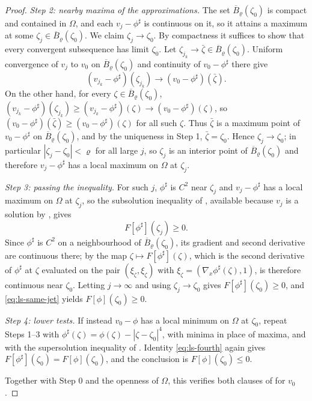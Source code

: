 \begin{proof}
\emph{Step 2: nearby maxima of the approximations.}
The set $\overline B_\varrho(\zeta_0)$ is compact and contained in $\Omega$, and
each $v_j-\phi^\sharp$ is continuous on it, so it attains a maximum at some
$\zeta_j\in\overline B_\varrho(\zeta_0)$. We claim $\zeta_j\to\zeta_0$. By
compactness it suffices to show that every convergent subsequence has limit
$\zeta_0$. Let $\zeta_{j_k}\to\bar\zeta\in\overline B_\varrho(\zeta_0)$. Uniform
convergence of $v_j$ to $v_0$ on $\overline B_\varrho(\zeta_0)$ and continuity of
$v_0-\phi^\sharp$ there give
\[
  (v_{j_k}-\phi^\sharp)(\zeta_{j_k})\longrightarrow
  (v_0-\phi^\sharp)(\bar\zeta).
\]
On the other hand, for every $\zeta\in\overline B_\varrho(\zeta_0)$,
$(v_{j_k}-\phi^\sharp)(\zeta_{j_k})\ge(v_{j_k}-\phi^\sharp)(\zeta)
 \to(v_0-\phi^\sharp)(\zeta)$, so
$(v_0-\phi^\sharp)(\bar\zeta)\ge(v_0-\phi^\sharp)(\zeta)$ for all such $\zeta$.
Thus $\bar\zeta$ is a maximum point of $v_0-\phi^\sharp$ on
$\overline B_\varrho(\zeta_0)$, and by the uniqueness in Step 1,
$\bar\zeta=\zeta_0$. Hence $\zeta_j\to\zeta_0$; in particular
$|\zeta_j-\zeta_0|<\varrho$ for all large $j$, so $\zeta_j$ is an interior point
of $\overline B_\varrho(\zeta_0)$ and therefore $v_j-\phi^\sharp$ has a local
maximum on $\Omega$ at $\zeta_j$.

\emph{Step 3: passing the inequality.}
For such $j$, $\phi^\sharp$ is $C^2$ near $\zeta_j$ and $v_j-\phi^\sharp$ has a
local maximum on $\Omega$ at $\zeta_j$, so the subsolution inequality of
, available because $v_j$ is a solution by
, gives
\[
  F[\phi^\sharp](\zeta_j)\ge0 .
\]
Since $\phi^\sharp$ is $C^2$ on a neighbourhood of
$\overline B_\varrho(\zeta_0)$, its gradient and second derivative are
continuous there; by  the map
$\zeta\mapsto F[\phi^\sharp](\zeta)$, which is the second derivative of
$\phi^\sharp$ at $\zeta$ evaluated on the pair $(\xi_\zeta,\xi_\zeta)$ with
$\xi_\zeta=(\nabla_x\phi^\sharp(\zeta),1)$, is therefore continuous near
$\zeta_0$. Letting $j\to\infty$ and using $\zeta_j\to\zeta_0$ gives
$F[\phi^\sharp](\zeta_0)\ge0$, and \eqref{eq:ls-same-jet} yields
$F[\phi](\zeta_0)\ge0$.

\emph{Step 4: lower tests.}
If instead $v_0-\phi$ has a local minimum on $\Omega$ at $\zeta_0$, repeat
Steps 1--3 with $\phi^\sharp(\zeta)=\phi(\zeta)-|\zeta-\zeta_0|^4$, with minima
in place of maxima, and with the supersolution inequality of
. Identity \eqref{eq:ls-fourth} again gives
$F[\phi^\sharp](\zeta_0)=F[\phi](\zeta_0)$, and the conclusion is
$F[\phi](\zeta_0)\le0$.

Together with Step 0 and the openness of $\Omega$, this verifies both clauses of
 for $v_0$.
\end{proof}
